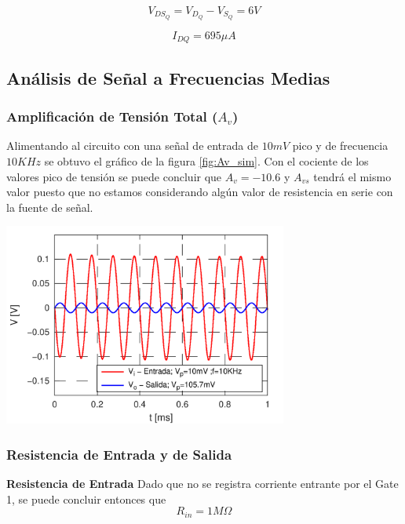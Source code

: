 \documentclass[a4paper, 10pt, spanish]{article}
\begin{document}
\begin{equation}
  V_{DS_{Q}} = V_{D_Q} - V_{S_Q} = 6V
\end{equation}

\begin{equation}
  I_{DQ} = 695 \mu A
\end{equation}

\subsection{Análisis de Señal a Frecuencias Medias}

\subsubsection{Amplificación de Tensión Total ($A_v$)}
Alimentando al circuito con una señal de entrada de $10mV$ pico y de frecuencia $10KHz$ se obtuvo el gráfico de la figura \ref{fig:Av_sim}. Con el cociente de los valores pico de tensión se puede concluir que $A_v=-10.6$ y $A_{vs}$ tendrá el mismo valor puesto que no estamos considerando algún valor de resistencia en serie con la fuente de señal.

\begin{center}
  \includegraphics[width=0.7\textwidth]{Av_sim.png}
  \label{fig:Av_sim}
\end{center}

\subsubsection{Resistencia de Entrada y de Salida}
\textbf{Resistencia de Entrada}
Dado que no se registra corriente entrante por el Gate 1, se puede concluir entonces que
\begin{equation}
  R_{in} = 1M\Omega
\end{equation}
\end{document}
